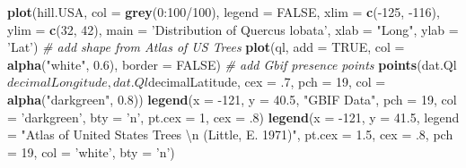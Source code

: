 \documentclass[author-year, review, 11pt]{components/elsarticle} %
\newenvironment{Shaded}{\begin{snugshade}}{\end{snugshade}}
\newcommand{\KeywordTok}[1]{\textcolor[rgb]{0.13,0.29,0.53}{\textbf{{#1}}}}
\newcommand{\DataTypeTok}[1]{\textcolor[rgb]{0.13,0.29,0.53}{{#1}}}
\newcommand{\DecValTok}[1]{\textcolor[rgb]{0.00,0.00,0.81}{{#1}}}
\newcommand{\FloatTok}[1]{\textcolor[rgb]{0.00,0.00,0.81}{{#1}}}
\newcommand{\CharTok}[1]{\textcolor[rgb]{0.31,0.60,0.02}{{#1}}}
\newcommand{\StringTok}[1]{\textcolor[rgb]{0.31,0.60,0.02}{{#1}}}
\newcommand{\CommentTok}[1]{\textcolor[rgb]{0.56,0.35,0.01}{\textit{{#1}}}}
\newcommand{\OtherTok}[1]{\textcolor[rgb]{0.56,0.35,0.01}{{#1}}}
\newcommand{\NormalTok}[1]{{#1}}
\begin{document}
\begin{Shaded}
\begin{Highlighting}[]
\KeywordTok{plot}\NormalTok{(hill.USA, }\DataTypeTok{col =} \KeywordTok{grey}\NormalTok{(}\DecValTok{0}\NormalTok{:}\DecValTok{100}\NormalTok{/}\DecValTok{100}\NormalTok{), }\DataTypeTok{legend =} \OtherTok{FALSE}\NormalTok{,}
     \DataTypeTok{xlim =} \KeywordTok{c}\NormalTok{(-}\DecValTok{125}\NormalTok{, -}\DecValTok{116}\NormalTok{), }\DataTypeTok{ylim =} \KeywordTok{c}\NormalTok{(}\DecValTok{32}\NormalTok{, }\DecValTok{42}\NormalTok{),}
     \DataTypeTok{main =} \StringTok{'Distribution of Quercus lobata'}\NormalTok{,}
     \DataTypeTok{xlab =} \StringTok{"Long"}\NormalTok{, }\DataTypeTok{ylab =} \StringTok{'Lat'}\NormalTok{)}
\CommentTok{# add shape from Atlas of US Trees}
\KeywordTok{plot}\NormalTok{(ql, }\DataTypeTok{add =} \OtherTok{TRUE}\NormalTok{, }\DataTypeTok{col =} \KeywordTok{alpha}\NormalTok{(}\StringTok{"white"}\NormalTok{, }\FloatTok{0.6}\NormalTok{),}
     \DataTypeTok{border =} \OtherTok{FALSE}\NormalTok{)}
\CommentTok{# add Gbif presence points}
\KeywordTok{points}\NormalTok{(dat.Ql$decimalLongitude, dat.Ql$decimalLatitude,}
       \DataTypeTok{cex =} \NormalTok{.}\DecValTok{7}\NormalTok{, }\DataTypeTok{pch =} \DecValTok{19}\NormalTok{, }\DataTypeTok{col =} \KeywordTok{alpha}\NormalTok{(}\StringTok{"darkgreen"}\NormalTok{, }\FloatTok{0.8}\NormalTok{))}
\KeywordTok{legend}\NormalTok{(}\DataTypeTok{x =} \NormalTok{-}\DecValTok{121}\NormalTok{, }\DataTypeTok{y =} \FloatTok{40.5}\NormalTok{, }\StringTok{"GBIF Data"}\NormalTok{, }\DataTypeTok{pch =} \DecValTok{19}\NormalTok{,}
       \DataTypeTok{col =} \StringTok{'darkgreen'}\NormalTok{, }\DataTypeTok{bty =} \StringTok{'n'}\NormalTok{, }\DataTypeTok{pt.cex =} \DecValTok{1}\NormalTok{, }\DataTypeTok{cex =} \NormalTok{.}\DecValTok{8}\NormalTok{)}
\KeywordTok{legend}\NormalTok{(}\DataTypeTok{x =} \NormalTok{-}\DecValTok{121}\NormalTok{, }\DataTypeTok{y =} \FloatTok{41.5}\NormalTok{,}
       \DataTypeTok{legend =} \StringTok{"Atlas of United States Trees }\CharTok{\textbackslash{}n}\StringTok{ (Little, E. 1971)"}\NormalTok{,}
       \DataTypeTok{pt.cex =} \FloatTok{1.5}\NormalTok{, }\DataTypeTok{cex =} \NormalTok{.}\DecValTok{8}\NormalTok{, }\DataTypeTok{pch =} \DecValTok{19}\NormalTok{, }\DataTypeTok{col =} \StringTok{'white'}\NormalTok{, }\DataTypeTok{bty =} \StringTok{'n'}\NormalTok{)}
\end{Highlighting}
\end{Shaded}
\end{document}
